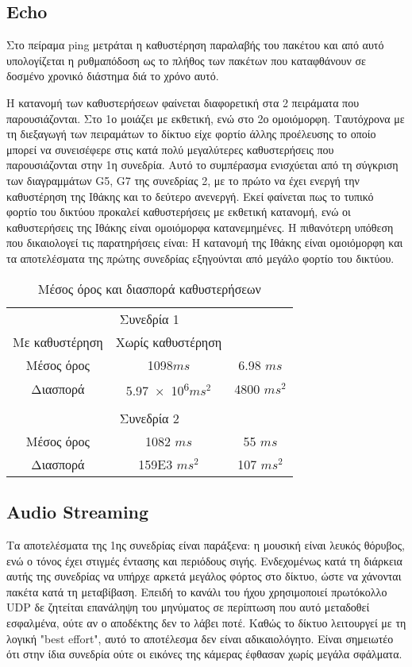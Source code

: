 \documentclass[a4paper,10pt]{article}
\begin{document}
\subsection{\foreignlanguage{english}{Echo}}
Στο πείραμα \foreignlanguage{english}{ping} μετράται η καθυστέρηση παραλαβής του πακέτου και από αυτό υπολογίζεται η ρυθμαπόδοση ως το πλήθος των πακέτων που καταφθάνουν σε δοσμένο χρονικό διάστημα διά το χρόνο αυτό.

Η κατανομή των καθυστερήσεων φαίνεται διαφορετική στα 2 πειράματα που παρουσιάζονται. Στο 1ο μοιάζει με εκθετική, ενώ στο 2ο ομοιόμορφη. Ταυτόχρονα με τη διεξαγωγή των πειραμάτων το δίκτυο είχε φορτίο άλλης προέλευσης το οποίο μπορεί να συνεισέφερε στις κατά πολύ μεγαλύτερες καθυστερήσεις που παρουσιάζονται στην 1η συνεδρία. Αυτό το συμπέρασμα ενισχύεται από τη σύγκριση των διαγραμμάτων \foreignlanguage{english}{G5, G7} της συνεδρίας 2, με το πρώτο να έχει ενεργή την καθυστέρηση της Ιθάκης και το δεύτερο ανενεργή. Εκεί φαίνεται πως το τυπικό φορτίο του δικτύου προκαλεί καθυστερήσεις με εκθετική κατανομή, ενώ οι καθυστερήσεις της Ιθάκης είναι ομοιόμορφα κατανεμημένες. Η πιθανότερη υπόθεση που δικαιολογεί τις παρατηρήσεις είναι: Η κατανομή της Ιθάκης είναι ομοιόμορφη και τα αποτελέσματα της πρώτης συνεδρίας εξηγούνται από μεγάλο φορτίο του δικτύου.

\begin{table}
	\centering
	\begin{tabular}{c|cc}
	  \multicolumn{3}{c}{Συνεδρία 1}\\
		Με καθυστέρηση & Χωρίς καθυστέρηση\\
		\hline
		Μέσος όρος & \num{1098}$ms$ & \num{6.98} $ms$\\
		Διασπορά & \num{5.97e+6}$ms^2$ & \num{4800} $ms^2$\\
		\\
		\multicolumn{3}{c}{Συνεδρία 2}\\
		\hline
		Μέσος όρος & \num{1082} $ms$ & \num{55} $ms$\\
		Διασπορά & \num{159E3} $ms^2$ & \num{107} $ms^2$
	\end{tabular}

	\caption{Μέσος όρος και διασπορά καθυστερήσεων}
\end{table}

\subsection{\foreignlanguage{english}{Audio Streaming}}
Τα αποτελέσματα της 1ης συνεδρίας είναι παράξενα: η μουσική είναι λευκός θόρυβος, ενώ ο τόνος έχει στιγμές έντασης και περιόδους σιγής. Ενδεχομένως κατά τη διάρκεια αυτής της συνεδρίας να υπήρχε αρκετά μεγάλος φόρτος στο δίκτυο, ώστε να χάνονται πακέτα κατά τη μεταβίβαση.
Επειδή το κανάλι του ήχου χρησιμοποιεί πρωτόκολλο \foreignlanguage{english}{UDP} δε ζητείται επανάληψη του μηνύματος σε περίπτωση που αυτό μεταδοθεί εσφαλμένα, ούτε αν ο αποδέκτης δεν το λάβει ποτέ. Καθώς το δίκτυο λειτουργεί με τη λογική \foreignlanguage{english}{"best effort"}, αυτό το αποτέλεσμα δεν είναι αδικαιολόγητο. Είναι σημειωτέο ότι στην ίδια συνεδρία ούτε οι εικόνες της κάμερας έφθασαν χωρίς μεγάλα σφάλματα.
\end{document}
